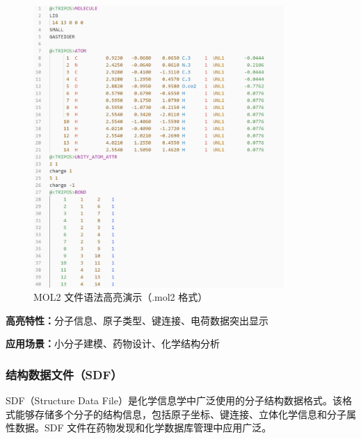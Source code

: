 \begin{figure}[!h]
    \centering
    \includegraphics[width=0.85\textwidth]{../images/mol2.png}
    \caption{MOL2 文件语法高亮演示（.mol2 格式）}
    \label{fig:mol2-highlighting}
\end{figure}

\textbf{高亮特性：}分子信息、原子类型、键连接、电荷数据突出显示

\textbf{应用场景：}小分子建模、药物设计、化学结构分析

\subsubsection{结构数据文件（SDF）}

SDF（Structure Data File）是化学信息学中广泛使用的分子结构数据格式。该格式能够存储多个分子的结构信息，包括原子坐标、键连接、立体化学信息和分子属性数据。SDF 文件在药物发现和化学数据库管理中应用广泛。

